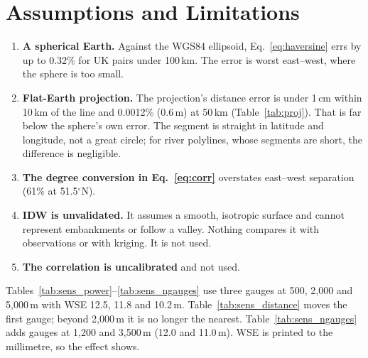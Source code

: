 \documentclass[11pt,a4paper]{article}
\begin{document}
\section{Assumptions and Limitations}

\begin{enumerate}[nosep]
    \item \textbf{A spherical Earth.} Against the WGS84 ellipsoid,
          Eq.~\eqref{eq:haversine} errs by up to 0.32\% for UK pairs under 100\,km. The
          error is worst east--west, where the sphere is too small.
    \item \textbf{Flat-Earth projection.} The projection's distance error is under 1\,cm
          within 10\,km of the line and 0.0012\% (0.6\,m) at 50\,km
          (Table~\ref{tab:proj}). That is far below the sphere's own error. The segment is
          straight in latitude and longitude, not a great circle; for river polylines,
          whose segments are short, the difference is negligible.
    \item \textbf{The degree conversion in Eq.~\eqref{eq:corr}} overstates east--west
          separation (61\% at 51.5$^\circ$N).
    \item \textbf{IDW is unvalidated.} It assumes a smooth, isotropic surface and cannot
          represent embankments or follow a valley. Nothing compares it with observations
          or with kriging. It is not used.
    \item \textbf{The correlation is uncalibrated} and not used.
\end{enumerate}

\mkmsensitivity

Tables~\ref{tab:sens_power}--\ref{tab:sens_ngauges} use three gauges at 500, 2{,}000 and
5{,}000\,m with WSE 12.5, 11.8 and 10.2\,m. Table~\ref{tab:sens_distance} moves the first
gauge; beyond 2{,}000\,m it is no longer the nearest. Table~\ref{tab:sens_ngauges} adds
gauges at 1{,}200 and 3{,}500\,m (12.0 and 11.0\,m). WSE is printed to the millimetre, so
the effect shows.
\end{document}
